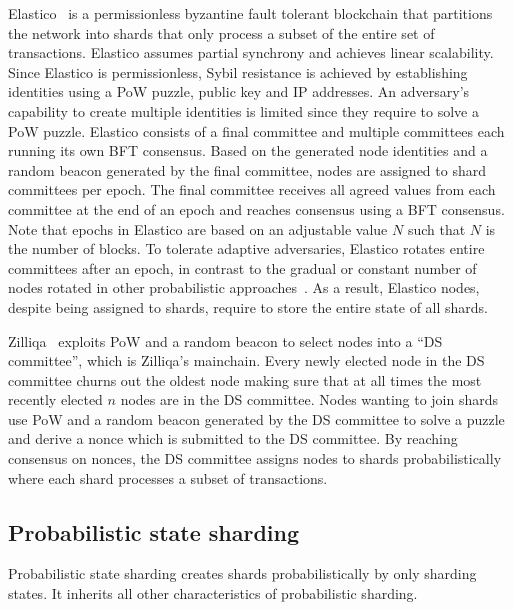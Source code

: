 \documentclass[11pt,dvipdfm]{article}
\newcommand{\vincent}[1]{\emph{Vincent: #1}}%
\newcommand{\deepal}[1]{\emph{Deepal: #1}}%
\begin{document}
Elastico~\cite{LNZ16} is a permissionless byzantine fault tolerant blockchain that partitions the network into shards that only process a subset of the entire set of transactions. Elastico assumes partial synchrony and achieves linear scalability. Since Elastico is permissionless, Sybil resistance is achieved by establishing identities using a PoW puzzle, public key and IP addresses. An adversary's capability to create multiple identities is limited since they require to solve a PoW puzzle. Elastico consists of a final committee and multiple committees each running its own BFT consensus.
Based on the generated node identities and a random beacon generated by the final committee, nodes are assigned to shard committees per epoch. The final committee receives all agreed values from each committee at the end of an epoch and reaches consensus using a BFT consensus. Note that epochs in Elastico are based on an adjustable value $N$ such that $N$ is the number of blocks. To tolerate adaptive adversaries, Elastico rotates entire committees after an epoch, in contrast to the gradual or constant number of nodes rotated in other probabilistic approaches~\cite{Eth2,ZMR18}. As a result, Elastico nodes, despite being assigned to shards, require to store the entire state of all shards.




Zilliqa~\cite{ZilliqaPaper} exploits PoW and a random beacon to select nodes into a ``DS committee'', which is Zilliqa's mainchain. Every newly elected node in the DS committee churns out the oldest node making sure that at all times the most recently elected $n$ nodes are in the DS committee. Nodes wanting to join shards use PoW and a random beacon generated by the DS committee to solve a puzzle and derive a nonce which is submitted to the DS committee. By reaching consensus on nonces, the DS committee assigns nodes to shards probabilistically where each shard processes a subset of transactions.


\subsection{Probabilistic state sharding}
Probabilistic state sharding creates shards probabilistically by only sharding states. It inherits all other characteristics of probabilistic sharding.
\end{document}
